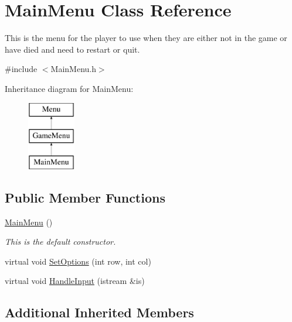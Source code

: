 \hypertarget{classMainMenu}{\section{Main\-Menu Class Reference}
\label{classMainMenu}
}


This is the menu for the player to use when they are either not in the game or have died and need to restart or quit.  




{\ttfamily \#include $<$Main\-Menu.\-h$>$}

Inheritance diagram for Main\-Menu\-:\begin{figure}[H]
\begin{center}
\leavevmode
\includegraphics[height=3.000000cm]{classMainMenu}
\end{center}
\end{figure}
\subsection*{Public Member Functions}
\begin{DoxyCompactItemize}
\item 
\hypertarget{classMainMenu_a53eecf9d5ffd094f54ac4193e7e57eaf}{\hyperlink{classMainMenu_a53eecf9d5ffd094f54ac4193e7e57eaf}{Main\-Menu} ()}\label{classMainMenu_a53eecf9d5ffd094f54ac4193e7e57eaf}

\begin{DoxyCompactList}\small\item\em This is the default constructor. \end{DoxyCompactList}\item 
virtual void \hyperlink{classMainMenu_a6cc91f1a72961ee4accde4f98ee8490a}{Set\-Options} (int row, int col)
\item 
virtual void \hyperlink{classMainMenu_a85703c73c1bcc9be2144b1cbe413328e}{Handle\-Input} (istream \&is)
\end{DoxyCompactItemize}
\subsection*{Additional Inherited Members}


